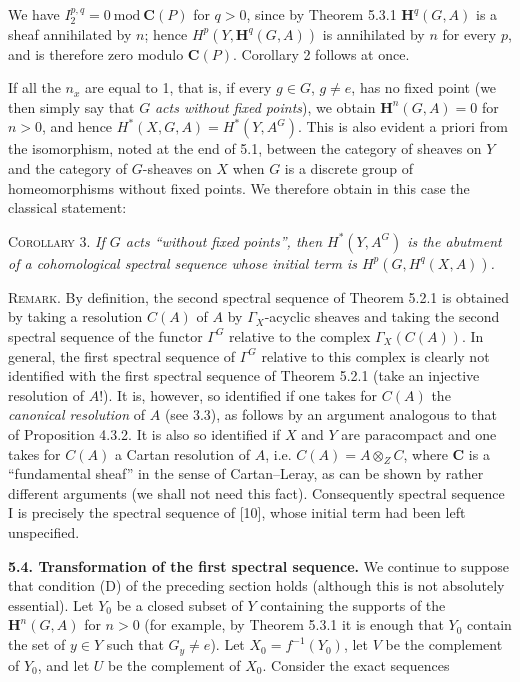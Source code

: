 \clearpage
{}

\noindent We have $I_2^{p,q}=0\ \mathrm{mod}\ {\mathbf C}(P)$ for $q>0$, since
by Theorem 5.3.1 $\mathbf H^q(G,A)$ is a sheaf annihilated by $n$; hence
$H^p(Y,\mathbf H^q(G,A))$ is annihilated by $n$ for every $p$, and is
therefore zero modulo ${\mathbf C}(P)$. Corollary 2 follows at once.

If all the $n_x$ are equal to 1, that is, if every $g\in G$, $g\ne e$, has no
fixed point (we then simply say that $G$ \textit{acts without fixed points}),
we obtain $\mathbf H^n(G,A)=0$ for $n>0$, and hence
$H^*(X,G,A)=H^*(Y,A^G)$. This is also evident a priori from the isomorphism,
noted at the end of 5.1, between the category of sheaves on $Y$ and the
category of $G$-sheaves on $X$ when $G$ is a discrete group of homeomorphisms
without fixed points. We therefore obtain in this case the classical
statement:

\textsc{Corollary 3.} \textit{If $G$ acts ``without fixed points'',
then $H^*(Y,A^G)$ is the abutment of a cohomological spectral sequence whose
initial term is $H^p(G,H^q(X,A))$.}

\textsc{Remark.} By definition, the second spectral sequence of
Theorem 5.2.1 is obtained by taking a resolution $C(A)$ of $A$ by
$\Gamma_X$-acyclic sheaves and taking the second spectral sequence of the
functor $\Gamma^G$ relative to the complex $\Gamma_X(C(A))$. In general, the
first spectral sequence of $\Gamma^G$ relative to this complex is clearly not
identified with the first spectral sequence of Theorem 5.2.1 (take an
injective resolution of $A$!). It is, however, so identified if one takes for
$C(A)$ the \textit{canonical resolution} of $A$ (see 3.3), as follows by an
argument analogous to that of Proposition 4.3.2. It is also so identified if
$X$ and $Y$ are paracompact and one takes for $C(A)$ a Cartan resolution of
$A$, i.e. $C(A)=A\otimes_ZC$, where ${\mathbf C}$ is a ``fundamental sheaf''
in the sense of Cartan--Leray, as can be shown by rather different arguments
(we shall not need this fact). Consequently spectral sequence I is precisely
the spectral sequence of [10], whose initial term had been left unspecified.

\bigskip
\textbf{5.4. Transformation of the first spectral sequence.} We
continue to suppose that condition (D) of the preceding section holds
(although this is not absolutely essential).
Let $Y_0$ be a closed subset of $Y$ containing the supports of the
$\mathbf H^n(G,A)$ for $n>0$ (for example, by Theorem 5.3.1 it is enough that
$Y_0$ contain the set of $y\in Y$ such that $G_y\ne e$). Let
$X_0=f^{-1}(Y_0)$, let $V$ be the complement of $Y_0$, and let $U$ be the
complement of $X_0$. Consider the exact sequences

